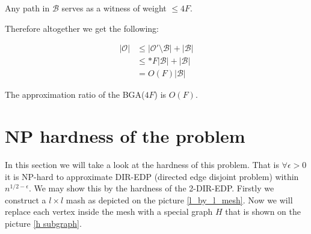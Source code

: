 \begin{observ}
	Any path in $\mathcal{B}$ serves as a witness of weight $\leq 4F$.
\end{observ}

Therefore altogether we get the following:

$$
\begin{aligned}
	|\mathcal{O}| &\leq |\mathcal{O}' \setminus \mathcal{B}| + |\mathcal{B}| \\
	 &\leq *F |\mathcal{B}| + |\mathcal{B}| \\
	 & = O(F) |\mathcal{B}|
\end{aligned}
$$

\begin{thm}
	The approximation ratio of the BGA($4F$) is $O(F)$.
\end{thm}

\section{NP hardness of the problem}


In this section we will take a look at the hardness of this problem. That is $\forall \epsilon > 0$ it is NP-hard to approximate DIR-EDP (directed edge disjoint problem) within $n^{1/2 - \epsilon}$. We may show this by the hardness of the 2-DIR-EDP. Firstly we construct a $l \times l$ mash as depicted on the picture \ref{l_by_l_mesh}. Now we will replace each vertex inside the mesh with a special graph $H$ that is shown on the picture \ref{h subgraph}.

